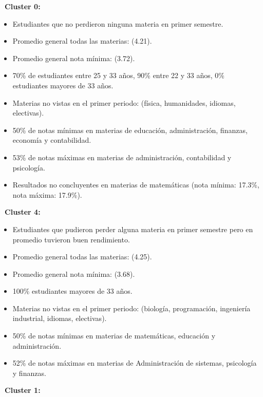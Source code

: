 \documentclass[fleqn,10pt]{SelfArx} %
\begin{document}
{\bf \textbullet\ Cluster 0:}\\ 

\begin{itemize}
 	\item Estudiantes que no perdieron ninguna materia en primer semestre.
	\item Promedio general todas las materias: (4.21).
	\item Promedio general nota mínima: (3.72).
	\item 70\% de estudiantes entre 25 y 33 años, 90\% entre 22 y 33 años, 0\% estudiantes mayores de 33 años.
	\item Materias no vistas en el primer periodo: (física, humanidades, idiomas, electivas).
	\item 50\% de notas mínimas en materias de educación, administración, finanzas, economía y contabilidad.
    \item 53\% de notas máximas en materias de administración, contabilidad y psicología.
    \item Resultados no concluyentes en materias de matemáticas (nota mínima: 17.3\%, nota máxima: 17.9\%).
\end{itemize}

{\bf \textbullet\ Cluster 4:}\\

\begin{itemize}
	\item Estudiantes que pudieron perder alguna materia en primer semestre pero en promedio tuvieron buen rendimiento.
	\item Promedio general todas las materias: (4.25).
	\item Promedio general nota mínima: (3.68).
	\item 100\% estudiantes mayores de 33 años.
	\item Materias no vistas en el primer periodo: (biología, programación, ingeniería industrial, idiomas, electivas).
	\item 50\% de notas mínimas en materias de matemáticas, educación y administración.
	\item 52\% de notas máximas en materias de Administración de sistemas, psicología y finanzas.
\end{itemize}

{\bf \textbullet\ Cluster 1:}\\
\end{document}
